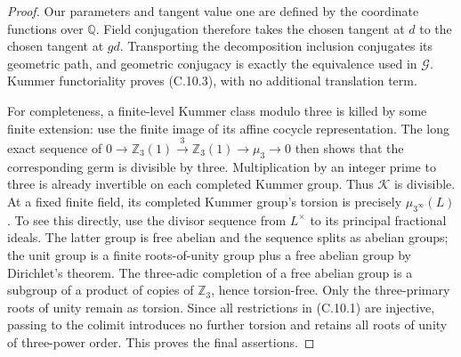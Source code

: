 \begin{proof}
Our parameters and tangent value one are defined by the
coordinate functions over $\mathbb Q$.  Field conjugation
therefore takes the chosen tangent at $d$ to the chosen
tangent at $gd$.  Transporting the decomposition inclusion
conjugates its geometric path, and geometric conjugacy is
exactly the equivalence used in $\mathscr G$.
Kummer functoriality proves (C.10.3), with no additional
translation term.

For completeness, a finite-level Kummer class modulo three
is killed by some finite extension: use the finite image of
its affine cocycle representation.  The long exact sequence
of $0\to\mathbb Z_3(1)\xrightarrow{3}\mathbb Z_3(1)
\to\mu_3\to0$ then shows that the corresponding germ is
divisible by three.  Multiplication by an integer prime to
three is already invertible on each completed Kummer group.
Thus $\mathscr K$ is divisible.
At a fixed finite field, its completed Kummer group's torsion
is precisely $\mu_{3^\infty}(L)$.  To see this directly, use
the divisor sequence from $L^\times$ to its principal
fractional ideals.  The latter group is free abelian and the
sequence splits as abelian groups; the unit group is a finite
roots-of-unity group plus a free abelian group by Dirichlet's
theorem.  The three-adic completion of a free abelian group
is a subgroup of a product of copies of $\mathbb Z_3$, hence
torsion-free.  Only the three-primary roots of unity remain
as torsion.  Since all restrictions in (C.10.1) are injective,
passing to the colimit introduces no further torsion and
retains all roots of unity of three-power order.  This proves
the final assertions.
\end{proof}

